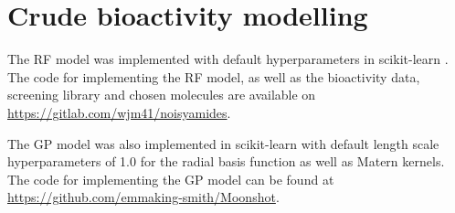 \section{Crude bioactivity modelling} \label{appendix:crude}
The RF model was implemented with default hyperparameters in scikit-learn \cite{scikit-learn}. The code for implementing the RF model, as well as the bioactivity data, screening library and chosen molecules are available on \url{https://gitlab.com/wjm41/noisyamides}.

The GP model was also implemented in scikit-learn \cite{scikit-learn} with default length scale hyperparameters of 1.0 for the radial basis function as well as Matern kernels. The code for implementing the GP model can be found at \url{https://github.com/emmaking-smith/Moonshot}.